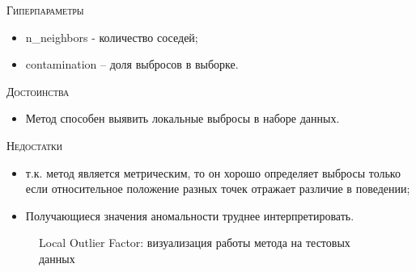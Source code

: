 \documentclass[12pt]{article}
\begin{document}
    \noindent \textsc{Гиперпараметры}
    \begin{itemize}
        \item n\_neighbors - количество соседей;
        \item contamination – доля выбросов в выборке.
    \end{itemize}

    \noindent \textsc{Достоинства}
    \begin{itemize}
        \item Метод способен выявить локальные выбросы в наборе данных.
    \end{itemize}
    
    \noindent \textsc{Недостатки}
    \begin{itemize}
        \item т.к. метод является метрическим, то он хорошо определяет выбросы только если относительное положение разных точек отражает различие в поведении;
        \item Получающиеся значения аномальности труднее интерпретировать.
    \end{itemize}

    \begin{figure}[h!]
        \centering
        \caption{Local Outlier Factor: визуализация работы метода на тестовых данных}
        \label{sec:Research:Model:Visualization:fig:LocalOutlierFactor}
    \end{figure}
\end{document}
